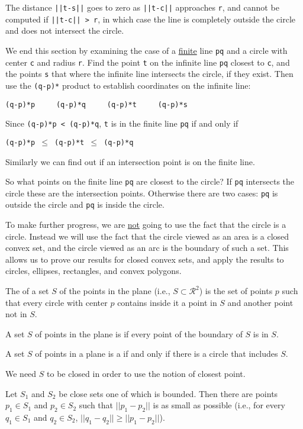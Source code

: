 \documentclass[12pt]{article}
\begin{document}
The distance {\tt ||t-s||} goes to zero as {\tt ||t-c||} approaches
{\tt r}, and cannot be computed if {\tt ||t-c|| > r}, in which case
the line is completely outside the circle and does not intersect the
circle.

We end this section by examining the case of a \underline{finite}
line {\tt pq} and a circle with center {\tt c} and radius {\tt r}.
Find the point {\tt t} on the infinite line {\tt pq} closest to
{\tt c}, and the points {\tt s} that where the infinite line intersects
the circle, if they exist.
Then use the {\tt (q-p)*} product to establish coordinates on the
infinite line: \\
\centerline{\tt (q-p)*p ~~~ (q-p)*q ~~~ (q-p)*t ~~~ (q-p)*s}
Since {\tt (q-p)*p~<~(q-p)*q},
{\tt t} is in the finite line {\tt pq} if and only if \\
\centerline{\tt (q-p)*p $\leq$ (q-p)*t $\leq$ (q-p)*q}
Similarly we can find out if an intersection point is on the finite
line.

So what points on the finite line {\tt pq} are closest to the circle?
If {\tt pq} intersects the circle these are the intersection points.
Otherwise there are two cases: {\tt pq} is outside the circle and
{\tt pq} is inside the circle.

To make further progress, we are \underline{not} going to use the fact that the
circle is a circle.
Instead we will use the fact that the circle viewed
as an area is a closed convex set, and the circle viewed as an arc
is the boundary of such a set.  This allows us to prove our results
for closed convex sets, and apply the results to circles, ellipses,
rectangles, and convex polygons.

\begin{definition}
The  of a set $S$ of the points in the plane
(i.e., $S\subset\mathcal{R}^2$) is the
set of points $p$ such that every circle with
center $p$ contains inside it a point in $S$ and another point not in $S$.

A set $S$ of points in the plane is  if every point
of the boundary of $S$ is in $S$.

A set $S$ of points in a plane is a  if and only if
there is a circle that includes $S$.
\end{definition}

We need $S$ to be closed in order to use the notion of
closest point.

\begin{lemma}\label{MINIMUM-DISTANCE}
Let $S_1$ and $S_2$ be close sets one of which is bounded.
Then there are points
$p_1\in S_1$ and $p_2\in S_2$ such that $||p_1-p_2||$ is as
small as possible (i.e., for every $q_1\in S_1$ and $q_2\in S_2$,
$||q_1-q_2||\ge||p_1-p_2||$).
\end{lemma}
\end{document}

